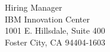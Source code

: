 \documentclass{letter} %
\begin{document}
\signature{Subhrangshu Nandi}           %
\longindentation=0pt                       %
\let\raggedleft\raggedright                %
 
 
\begin{letter}
{Hiring Manager \\
IBM Innovation Center \\
1001 E. Hillsdale, Suite 400 \\
Foster City, CA 94404-1603
}




\end{letter}
\end{document}
